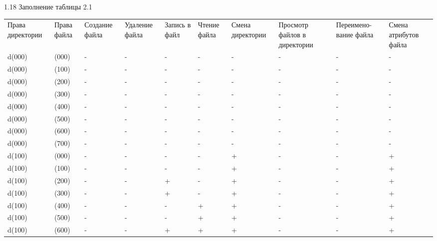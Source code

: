 \documentclass[
  ignorenonframetext,
  aspectratio=169,
  russian,
]{beamer}
\begin{document}
\begin{frame}{1.18 Заполнение таблицы 2.1}
\label{ux437ux430ux43fux43eux43bux43dux435ux43dux438ux435-ux442ux430ux431ux43bux438ux446ux44b-2.1}
\begin{longtable}[]{@{}
  >{\raggedright\arraybackslash}p{}
  >{\raggedright\arraybackslash}p{}
  >{\raggedright\arraybackslash}p{}
  >{\raggedright\arraybackslash}p{}
  >{\raggedright\arraybackslash}p{}
  >{\raggedright\arraybackslash}p{}
  >{\raggedright\arraybackslash}p{}
  >{\raggedright\arraybackslash}p{}
  >{\raggedright\arraybackslash}p{}
  >{\raggedright\arraybackslash}p{}@{}}
\toprule\noalign{}
\endhead
Права директории & Права файла & Создание файла & Удаление файла &
Запись в файл & Чтение файла & Смена директории & Просмотр файлов в
директории & Переимено- вание файла & Смена атрибутов файла \\
d(000) & (000) & - & - & - & - & - & - & - & - \\
d(000) & (100) & - & - & - & - & - & - & - & - \\
d(000) & (200) & - & - & - & - & - & - & - & - \\
d(000) & (300) & - & - & - & - & - & - & - & - \\
d(000) & (400) & - & - & - & - & - & - & - & - \\
d(000) & (500) & - & - & - & - & - & - & - & - \\
d(000) & (600) & - & - & - & - & - & - & - & - \\
d(000) & (700) & - & - & - & - & - & - & - & - \\
d(100) & (000) & - & - & - & - & + & - & - & + \\
d(100) & (100) & - & - & - & - & + & - & - & + \\
d(100) & (200) & - & - & + & - & + & - & - & + \\
d(100) & (300) & - & - & + & - & + & - & - & + \\
d(100) & (400) & - & - & - & + & + & - & - & + \\
d(100) & (500) & - & - & - & + & + & - & - & + \\
d(100) & (600) & - & - & + & + & + & - & - & + \\

\end{longtable}
\end{frame}
\end{document}
